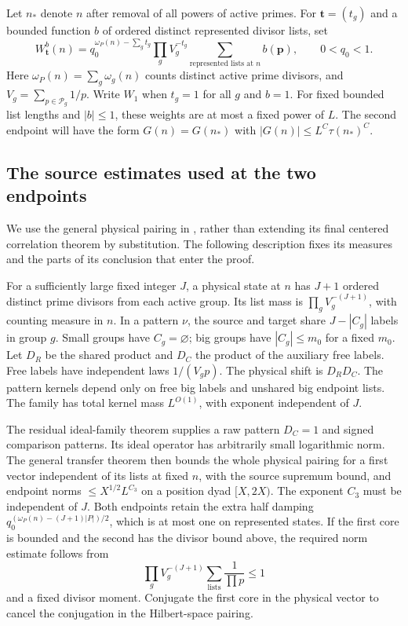 Let $n_*$ denote $n$ after removal of all powers of active primes.
For $\mathbf t=(t_g)$ and a bounded function $b$ of ordered distinct
represented divisor lists, set
\begin{equation}\label{eq:active}
 W_{\mathbf t}^{b}(n)=
 q_0^{\omega_P(n)-\sum_g t_g}\prod_g V_g^{-t_g}
 \sum_{\text{represented lists at }n} b(\mathbf p),
 \qquad 0<q_0<1.
\end{equation}
Here $\omega_P(n)=\sum_g\omega_g(n)$ counts distinct active prime
divisors, and $V_g=\sum_{p\in\mathcal P_g}1/p$.
Write $W_1$ when $t_g=1$ for all $g$ and $b=1$.
For fixed bounded list lengths and $|b|\leq1$, these weights are at
most a fixed power of $L$. The second endpoint will have the form
$G(n)=G(n_*)$ with $|G(n)|\leq L^C\tau(n_*)^C$.

\subsection{The source estimates used at the two endpoints}

We use the general physical pairing in \cite[Section 6]{D}, rather
than extending its final centered correlation theorem by substitution.
The following description fixes its measures and the parts of its
conclusion that enter the proof.

For a sufficiently large fixed integer $J$, a physical state at $n$
has $J+1$ ordered distinct prime divisors from each active group. Its
list mass is $\prod_g V_g^{-(J+1)}$, with counting measure in $n$.
In a pattern $\nu$, the source and target share $J-|C_g|$ labels in
group $g$. Small groups have $C_g=\varnothing$; big groups have
$|C_g|\leq m_0$ for a fixed $m_0$. Let $D_R$ be the shared product
and $D_C$ the product of the auxiliary free labels. Free labels have
independent laws $1/(V_gp)$. The physical shift is $D_RD_C$.
The pattern kernels depend only on free big labels and unshared big
endpoint lists. The family has total kernel mass $L^{O(1)}$, with
exponent independent of $J$.

The residual ideal-family theorem supplies a raw pattern $D_C=1$
and signed comparison patterns. Its ideal operator has arbitrarily
small logarithmic norm. The general transfer theorem then bounds the
whole physical pairing for a first vector independent of its lists at
fixed $n$, with the source supremum bound, and endpoint norms
$\leq X^{1/2}L^{C_3}$ on a position dyad $[X,2X)$.
The exponent $C_3$ must be independent of $J$.
Both endpoints retain the extra half damping
$q_0^{(\omega_P(n)-(J+1)|P|)/2}$, which is at most one on represented
states. If the first core is bounded and the second has the divisor
bound above, the required norm estimate follows from
\begin{equation}\label{eq:listnorm}
 \prod_g V_g^{-(J+1)}\sum_{\text{lists}}\frac1{\prod p}\leq1
\end{equation}
and a fixed divisor moment. Conjugate the first core in the physical
vector to cancel the conjugation in the Hilbert-space pairing.

